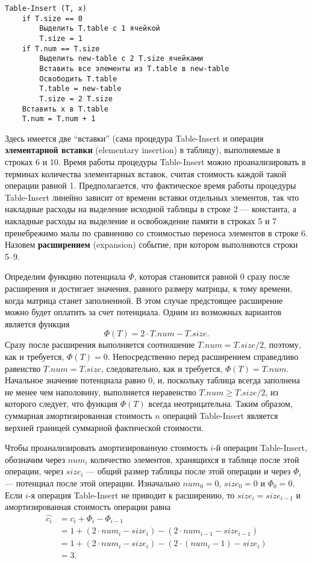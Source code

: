 \begin{verbatim}
Table-Insert (Т, х)
    if Т.size == 0
        Выделить Т.table с 1 ячейкой
        T.size = 1
    if Т.num == Т.size
        Выделить new-table с 2 T.size ячейками
        Вставить все элементы из Т.table в new-table
        Освободить Т.table
        Т.table = new-table
        Т.size = 2 Т.size
    Вставить x в Т.table
    Т.num = Т.num + 1
\end{verbatim}

Здесь имеется две “вставки” (сама процедура Table-Insert и операция \textbf{элементарной вставки} (elementary insertion) в таблицу), выполняемые в строках 6 и 10.
Время работы процедуры Table-Insert можно проанализировать в терминах количества элементарных вставок, считая стоимость каждой такой операции равной 1.
Предполагается, что фактическое время работы процедуры Table-Insert линейно зависит от времени вставки отдельных элементов, так что накладные расходы на выделение исходной таблицы в строке 2 --- константа, а накладные расходы на выделение и освобождение памяти в строках 5 и 7 пренебрежимо малы по сравнению со стоимостью переноса элементов в строке 6.
Назовем \textbf{расширением} (expansion) событие, при котором выполняются строки 5--9.

Определим функцию потенциала $\Phi$, которая становится равной 0 сразу после расширения и достигает значения, равного размеру матрицы, к тому времени, когда матрица станет заполненной.
В этом случае предстоящее расширение можно будет оплатить за счет потенциала.
Одним из возможных вариантов является функция $$\Phi(T) = 2 \cdot T.num - T.size.$$
Сразу после расширения выполняется соотношение $T.num = T.size/2$, поэтому, как и требуется, $\Phi(T) = 0$.
Непосредственно перед расширением справедливо равенство $T.num = T.size$, следовательно, как и требуется, $\Phi(T) = T.num$.
Начальное значение потенциала равно 0, и, поскольку таблица всегда заполнена не менее чем наполовину, выполняется неравенство $T.num \ge T.size / 2$, из которого следует, что функция $\Phi(T)$ всегда неотрицательна.
Таким образом, суммарная амортизированная стоимость $n$ операций Table-Insert является верхней границей суммарной фактической стоимости.

Чтобы проанализировать амортизированную стоимость $i$-й операции Table-Insert, обозначим через $num_i$ количество элементов, хранящихся в таблице после этой операции, через $size_i$ --- общий размер таблицы после этой операции и через $\Phi_i$ --- потенциал после этой операции.
Изначально $num_0 = 0$, $size_0 = 0$ и $\Phi_0 = 0$.
Если $i$-я операция Table-Insert не приводит к расширению, то $size_i = size_{i-1}$ и амортизированная стоимость операции равна 
\begin{align*}
    \hat{c_i} &= c_i + \Phi_i - \Phi_{i - 1} \\
    &= 1 + (2 \cdot num_i - size_i) - (2 \cdot num_{i - 1} - size_{i - 1}) \\
    &= 1 + (2 \cdot num_i - size_i) - (2 \cdot (num_i - 1) - size_i) \\
    &= 3.
\end{align*}

